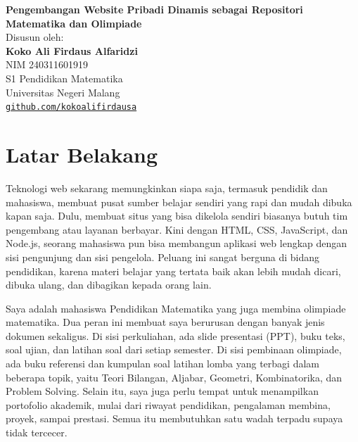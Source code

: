 \documentclass[12pt,a4paper]{article}
\begin{document}
	
	\begin{center}
		{\LARGE\textbf{Pengembangan Website Pribadi Dinamis sebagai Repositori Matematika dan Olimpiade}}\\[8pt]
		
		\vspace{20pt}
		{\small Disusun oleh:}\\[6pt]
		{\Large\textbf{Koko Ali Firdaus Alfaridzi}}\\[2pt]
		NIM 240311601919\\[10pt]
		S1 Pendidikan Matematika\\
		Universitas Negeri Malang\\[6pt]
		{\small\texttt{\url{github.com/kokoalifirdausa}}}
	\end{center}
	
	\vspace{6pt}
	
	\newpage
	\renewcommand{\contentsname}{Daftar Isi}
	\begingroup
	\hypersetup{linkcolor=black}%
	\tableofcontents
	\endgroup
	\newpage
	
	\section{Latar Belakang}
	
	Teknologi web sekarang memungkinkan siapa saja, termasuk pendidik dan mahasiswa, membuat pusat sumber belajar sendiri yang rapi dan mudah dibuka kapan saja. Dulu, membuat situs yang bisa dikelola sendiri biasanya butuh tim pengembang atau layanan berbayar. Kini dengan HTML, CSS, JavaScript, dan Node.js, seorang mahasiswa pun bisa membangun aplikasi web lengkap dengan sisi pengunjung dan sisi pengelola. Peluang ini sangat berguna di bidang pendidikan, karena materi belajar yang tertata baik akan lebih mudah dicari, dibuka ulang, dan dibagikan kepada orang lain.

	Saya adalah mahasiswa Pendidikan Matematika yang juga membina olimpiade matematika. Dua peran ini membuat saya berurusan dengan banyak jenis dokumen sekaligus. Di sisi perkuliahan, ada slide presentasi (PPT), buku teks, soal ujian, dan latihan soal dari setiap semester. Di sisi pembinaan olimpiade, ada buku referensi dan kumpulan soal latihan lomba yang terbagi dalam beberapa topik, yaitu Teori Bilangan, Aljabar, Geometri, Kombinatorika, dan Problem Solving. Selain itu, saya juga perlu tempat untuk menampilkan portofolio akademik, mulai dari riwayat pendidikan, pengalaman membina, proyek, sampai prestasi. Semua itu membutuhkan satu wadah terpadu supaya tidak tercecer.
\end{document}

